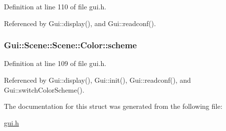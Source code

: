 Definition at line 110 of file gui.h.

Referenced by Gui::display(), and Gui::readconf().\hypertarget{structGui_1_1Scene_1_1Color_46a11eecf40dfe7a3c9d9950cb59e522}{
\subsubsection[{scheme}]{ Gui::Scene::Scene::Color::scheme}}
\label{structGui_1_1Scene_1_1Color_46a11eecf40dfe7a3c9d9950cb59e522}




Definition at line 109 of file gui.h.

Referenced by Gui::display(), Gui::init(), Gui::readconf(), and Gui::switchColorScheme().

The documentation for this struct was generated from the following file:\begin{CompactItemize}
\item 
\hyperlink{gui_8h}{gui.h}\end{CompactItemize}
